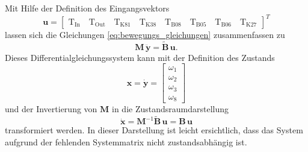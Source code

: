Mit Hilfe der Definition des Eingangsvektors
\begin{equation}\label{eq:u}
\pmb{u} = \begin{bmatrix} \mathrm{T}_{\mathrm{In}} \quad \mathrm{T}_{\mathrm{Out}} \quad \mathrm{T}_{\mathrm{K81}} \quad \mathrm{T}_{\mathrm{K38}} \quad \mathrm{T}_{\mathrm{B08}} \quad \mathrm{T}_{\mathrm{B05}} \quad \mathrm{T}_{\mathrm{B06}} \quad \mathrm{T}_{\mathrm{K27}} \end{bmatrix}^T
\end{equation}
lassen sich die Gleichungen \eqref{eq:bewegungs_gleichungen} zusammenfassen zu
\begin{equation}
\pmb{M}\,\ddot{\pmb{y}} = \tilde{\pmb{B}}\,\pmb{u}.
\end{equation}
Dieses Differentialgleichungssystem kann mit der Definition des Zustands
\begin{equation}
\pmb{x} = \dot{\pmb{y}} = \begin{bmatrix} \omega_1 \\ \omega_2 \\ \omega_3 \\ \omega_8\end{bmatrix}
\end{equation}
und der Invertierung von $\pmb{M}$ in die Zustandsraumdarstellung 
\begin{equation}
\dot{\pmb{x}} = \pmb{M}^{-1}\tilde{\pmb{B}}\,\pmb{u} = \pmb{B}\,\pmb{u}
\end{equation}
transformiert werden. In dieser Darstellung ist leicht ersichtlich, dass das System aufgrund der fehlenden Systemmatrix nicht zustandsabhängig ist.


